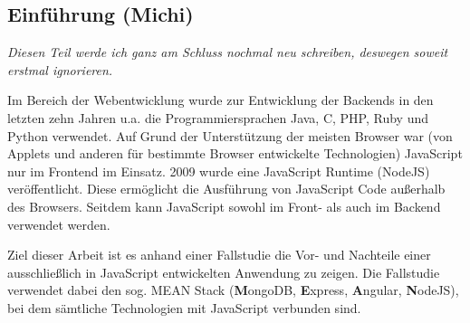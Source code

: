 \subsection{Einführung (Michi)}\label{einfuxfchrung-michi}

\emph{Diesen Teil werde ich ganz am Schluss nochmal neu schreiben,
deswegen soweit erstmal ignorieren.}

Im Bereich der Webentwicklung wurde zur Entwicklung der Backends in den
letzten zehn Jahren u.a. die Programmiersprachen Java, C, PHP, Ruby und
Python verwendet. Auf Grund der Unterstützung der meisten Browser war
(von Applets und anderen für bestimmte Browser entwickelte Technologien)
JavaScript nur im Frontend im Einsatz. 2009 wurde eine JavaScript
Runtime (NodeJS) veröffentlicht. Diese ermöglicht die Ausführung von
JavaScript Code außerhalb des Browsers. Seitdem kann JavaScript sowohl
im Front- als auch im Backend verwendet werden.

Ziel dieser Arbeit ist es anhand einer Fallstudie die Vor- und Nachteile
einer ausschließlich in JavaScript entwickelten Anwendung zu zeigen. Die
Fallstudie verwendet dabei den sog. MEAN Stack (\textbf{M}ongoDB,
\textbf{E}xpress, \textbf{A}ngular, \textbf{N}odeJS), bei dem sämtliche
Technologien mit JavaScript verbunden sind.